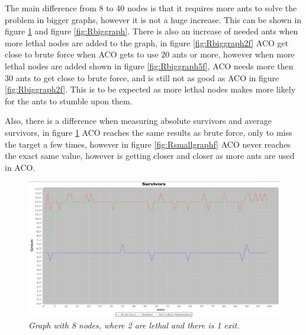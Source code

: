 The main difference from 8 to 40 nodes is that it requires more ants to solve the problem in bigger graphs, however it is not a huge increase. This can be shown in figure \ref{fig:Rsmallgraph} and figure \ref{fig:Rbiggraph}. There is also an increase of needed ants when more lethal nodes are added to the graph, in figure \ref{fig:Rbiggraph2f} ACO get close to brute force when ACO gets to use 20 ants or more, however when more lethal nodes are added shown in figure \ref{fig:Rbiggraph5f}, ACO needs more then 30 ants to get close to brute force, and is still not as good as ACO in figure \ref{fig:Rbiggraph2f}. This is to be expected as more lethal nodes makes more likely for the ants to stumble upon them.

 Also, there is a difference when measuring absolute survivors and average survivors, in figure \ref{fig:Rsmallgraph} ACO reaches the same results as brute force, only to miss the target a few times, however in figure \ref{fig:Rsmallgraphf} ACO never reaches the exact same value, however is getting closer and closer as more ants are used in ACO.


\begin{figure} %
\hspace*{-1.5 cm}
\includegraphics[width=160mm]{images/8Nodes2Leathal1Exit.png}
\caption{\textit{Graph with 8 nodes, where 2 are lethal and there is 1 exit.}}
\label{fig:Rsmallgraph}
\end{figure}

